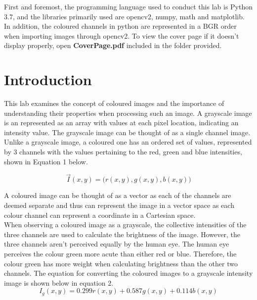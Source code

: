 \documentclass{article}
\begin{document}
	
	
	
	First and foremost, the programming language used to conduct this lab is Python 3.7, and the libraries primarily used are opencv2, numpy, math and matplotlib. In addition, the coloured channels in python are represented in a BGR order when importing images through opencv2. To view the cover page if it doesn't display properly, open \textbf{CoverPage.pdf} included in the folder provided.\\
	
	\section{Introduction}
	
	This lab examines the concept of coloured images and the importance of understanding their properties when processing such an image. A grayscale image is an represented as an array with values at each pixel location, indicating an intensity value. The grayscale image can be thought of as a single channel image. Unlike a grayscale image, a coloured one has an ordered set of values, represented by 3 channels with the values pertaining to the red, green and blue intensities, shown in Equation 1 below.
	
	\begin{equation}
		\vec{I}(x,y) = \Big( r(x,y),g(x,y),b(x,y) \Big)
	\end{equation}
	
	A coloured image can be thought of as a vector as each of the channels are deemed separate and thus can represent the image in a vector space as each colour channel can represent a coordinate in a Cartesian space.\\
	
	When observing a coloured image as a grayscale, the collective intensities of the three channels are used to calculate the brightness of the image. However, the three channels aren't perceived equally by the human eye. The human eye perceives the colour green more acute than either red or blue. Therefore, the colour green has more weight when calculating brightness than the other two channels. The equation for converting the coloured images to a grayscale intensity image is shown below in equation 2.\\
	
	\begin{equation}
		I_{g}(x,y) = 0.299r(x,y) + 0.587g(x,y) + 0.114b(x,y)
	\end{equation}
	
\end{document}
